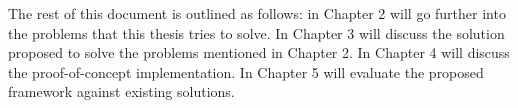 
The rest of this document is outlined as follows: in Chapter 2 will go further into the problems that this thesis tries to solve. In Chapter 3 will discuss the solution proposed to solve the problems mentioned in Chapter 2. In Chapter 4 will discuss the proof-of-concept implementation. In Chapter 5 will evaluate the proposed framework against existing solutions.


%
%
%
%
%
